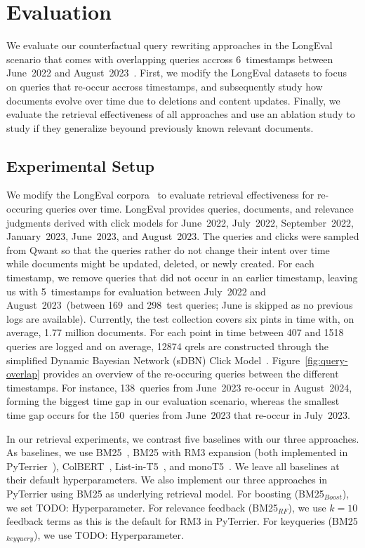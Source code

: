 \section{Evaluation}

We evaluate our counterfactual query rewriting approaches in the LongEval scenario that comes with overlapping queries accross 6~timestamps between June~2022 and August~2023~\cite{alkhalifa:2023,alkhalifa:2024,galuscakova:2023}. First, we modify the LongEval datasets to focus on queries that re-occur accross timestamps, and subsequently study how documents evolve over time due to deletions and content updates. Finally, we evaluate the retrieval effectiveness of all approaches and use an ablation study to study if they generalize beyound previously known relevant documents.

\subsection{Experimental Setup}

We modify the LongEval corpora~\cite{alkhalifa:2023,alkhalifa:2024,galuscakova:2023} to evaluate retrieval effectiveness for re-occuring queries over time. LongEval provides queries, documents, and relevance judgments derived with click models for June~2022, July~2022, September~2022, January~2023, June~2023, and August~2023. The queries and clicks were sampled from Qwant so that the queries rather do not change their intent over time~\cite{galuscakova:2023} while documents might be updated, deleted, or newly created. For each timestamp, we remove queries that did not occur in an earlier timestamp, leaving us with 5~timestamps for evaluation between July~2022 and August~2023~(between 169~and 298~test queries; June is skipped as no previous logs are available). Currently, the test collection covers six pints in time with, on average, 1.77 million documents. For each point in time between 407 and 1518 queries are logged and on average, 12874 qrels are constructed through the simplified Dynamic Bayesian Network (sDBN) Click Model~\cite{chapelle:2009}. Figure~\ref{fig:query-overlap} provides an overview of the re-occuring queries between the different timestamps. For instance, 138~queries from June~2023 re-occur in August~2024, forming the biggest time gap in our evaluation scenario, whereas the smallest time gap occurs for the 150~queries from June~2023 that re-occur in July~2023.

In our retrieval experiments, we contrast five baselines with our three approaches. As baselines, we use BM25~\cite{robertson:1994}, BM25 with RM3 expansion (both implemented in PyTerrier~\cite{macdonald:2020}), ColBERT~\cite{khattab:2020}, List-in-T5~\cite{tamber:2023}, and monoT5~\cite{nogueira:2020}. We leave all baselines at their default hyperparameters. We also implement our three approaches in PyTerrier using BM25 as underlying retrieval model. For boosting (BM25$_{Boost}$), we set {\color{red} TODO: Hyperparameter}. For relevance feedback  (BM25$_{RF}$), we use $k=10$ feedback terms as this is the default for RM3 in PyTerrier. For keyqueries (BM25$_{keyquery}$), we use {\color{red} TODO: Hyperparameter}.


